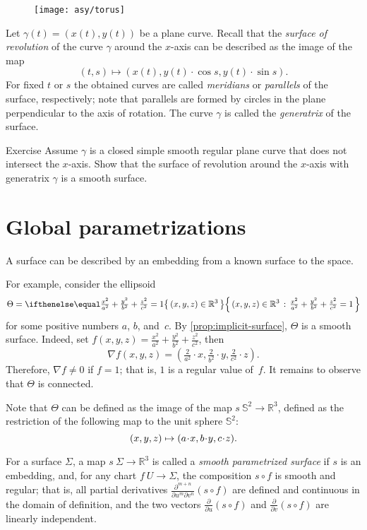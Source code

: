 \begin{wrapfigure}{o}{31 mm}
\vskip0mm
\centering
\texttt{[image: asy/torus]}
\vskip0mm
\end{wrapfigure}

Let $\gamma(t)=(x(t),y(t))$ be a plane curve.
Recall that the \emph{surface of revolution} of the curve $\gamma$ around the $x$-axis can be described as the 
image of the map 
\[(t, s)\mapsto (x(t), y(t)\cdot\cos s,y(t)\cdot\sin s).\]
For fixed $t$ or $s$ the obtained curves are called \emph{meridians} or \emph{parallels} of the surface, respectively; note that parallels are formed by circles in the plane perpendicular to the axis of rotation.
The curve $\gamma$ is called the \emph{generatrix} of the surface.

\begin{thm}{Exercise}\label{ex:revolution}
Assume $\gamma$ is a closed simple smooth regular plane curve that does not intersect the $x$-axis.
Show that the surface of revolution around the $x$-axis with generatrix $\gamma$ is a smooth surface.
\end{thm}


\section{Global parametrizations}

A surface can be described by an embedding from a known surface to the space.

For example, consider the ellipsoid
\[\Theta=\set{(x,y,z)\in\mathbb{R}^3}{\tfrac{x^2}{a^2}+\tfrac{y^2}{b^2}+\tfrac{z^2}{c^2}=1}\]
for some positive numbers $a$, $b$, and~$c$.
By \ref{prop:implicit-surface}, $\Theta$ is a smooth surface.
Indeed, set $f(x,y,z)=\tfrac{x^2}{a^2}+\tfrac{y^2}{b^2}+\tfrac{z^2}{c^2}$,
then
\[\nabla f(x,y,z)=(\tfrac{2}{a^2}\cdot x,\tfrac{2}{b^2}\cdot y,\tfrac{2}{c^2}\cdot z).\]
Therefore, $\nabla f\ne0$ if $f=1$; that is, $1$ is a regular value of~$f$.
It remains to observe that $\Theta$ is connected.

Note that $\Theta$ can be defined as the image of the map $s\:\mathbb{S}^2\to\mathbb{R}^3$, defined as the restriction of the following map to the unit sphere $\mathbb{S}^2$:
\[(x,y,z)\z\mapsto (a\cdot x, b\cdot y,c\cdot z).\]

For a surface $\Sigma$, a map $s\: \Sigma \to \mathbb{R}^3$ is called a 
\emph{smooth parametrized surface} if $s$ is an embedding, and, for any chart $f\:U\to \Sigma$,
the composition $s\circ f$ is smooth and regular;
that is, all partial derivatives $\frac{\partial^{m+n}}{\partial u^m\partial v^n}(s\circ f)$ are defined and continuous in the domain of definition, and the two vectors 
$\frac{\partial}{\partial u}(s\circ f)$ and $\frac{\partial}{\partial v}(s\circ f)$ are linearly independent.


